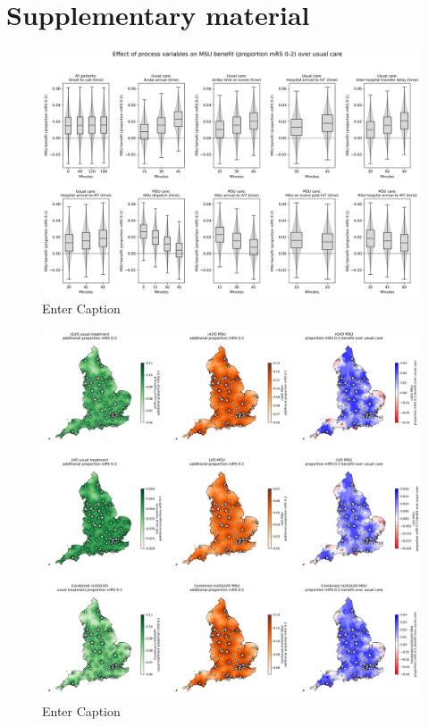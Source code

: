 \section{Supplementary material}


\begin{figure}
    \centering
    \includegraphics[width=1\linewidth]{images/msu_net_mrs_0-2_benefit.png}
    \caption{Enter Caption}
    \label{fig:enter-label}
\end{figure}

\begin{figure}
    \centering
    \includegraphics[width=1\linewidth]{images/map_mrs_0_2.jpg}
    \caption{Enter Caption}
    \label{fig:enter-label}
\end{figure}

